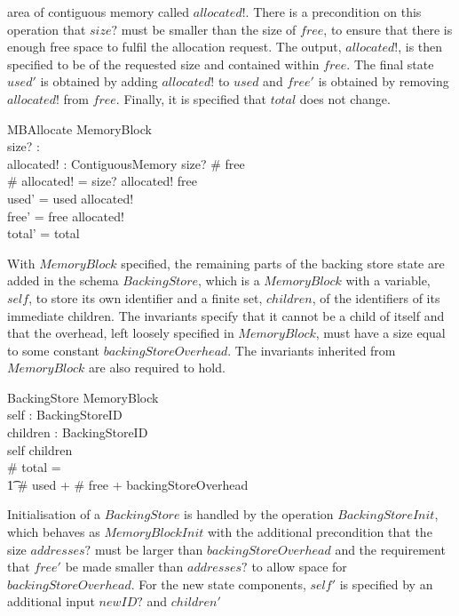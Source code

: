 \documentclass[a4paper,10pt]{report}
\begin{document}
area of contiguous memory called $allocated!$. There is a precondition on this
operation that $size?$ must be smaller than the size of $free$, to ensure that
there is enough free space to fulfil the allocation request. The output,
$allocated!$, is then specified to be of the requested size and contained within
$free$. The final state $used'$ is obtained by adding $allocated!$ to $used$ and
$free'$ is obtained by removing $allocated!$ from $free$. Finally, it is
specified that $total$ does not change.
%
\begin{schema}{MBAllocate}
  \Delta MemoryBlock \\
  size? : \nat \\
  allocated! : ContiguousMemory
\where
  size? \leq \# free \\
  \# allocated! = size? \land allocated! \subseteq free \\
  used' = used \cup allocated! \\
  free' = free \setminus allocated! \\
  total' = total \\
\end{schema}
%
With $MemoryBlock$ specified, the remaining parts of the backing store state are
added in the schema $BackingStore$, which is a $MemoryBlock$ with a variable,
$self$, to store its own identifier and a finite set, $children$, of the
identifiers of its immediate children. The invariants specify that it cannot be
a child of itself and that the overhead, left loosely specified in
$MemoryBlock$, must have a size equal to some constant
$backingStoreOverhead$. The invariants inherited from $MemoryBlock$ are also
required to hold.
%
\begin{schema}{BackingStore}
	MemoryBlock \\
  	self : BackingStoreID \\
  	children : \finset BackingStoreID \\
\where
 	self \notin children \\
 	\# total = \\
        \t1 \# used + \# free + backingStoreOverhead
\end{schema}
%
Initialisation of a $BackingStore$ is handled by the operation
$BackingStoreInit$, which behaves as $MemoryBlockInit$ with the additional
precondition that the size $addresses?$ must be larger than
$backingStoreOverhead$ and the requirement that $free'$ be made smaller than
$addresses?$ to allow space for $backingStoreOverhead$. For the new state
components, $self'$ is specified by an additional input $newID?$ and $children'$
\end{document}
